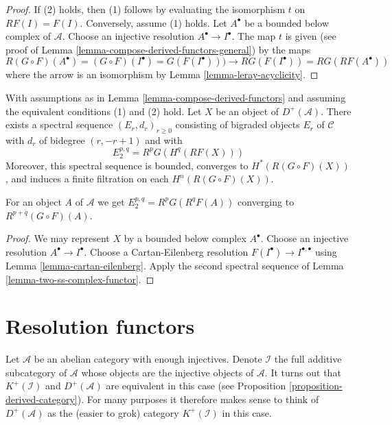 \begin{proof}
If (2) holds, then (1) follows by evaluating the isomorphism
$t$ on $RF(I) = F(I)$. Conversely, assume (1) holds.
Let $A^\bullet$ be a bounded below complex of $\mathcal{A}$.
Choose an injective resolution $A^\bullet \to I^\bullet$.
The map $t$ is given (see proof of
Lemma \ref{lemma-compose-derived-functors-general})
by the maps
$$
R(G \circ F)(A^\bullet) =
(G \circ F)(I^\bullet) =
G(F(I^\bullet))) \to
RG(F(I^\bullet)) =
RG(RF(A^\bullet))
$$
where the arrow is an isomorphism by
Lemma \ref{lemma-leray-acyclicity}.
\end{proof}

\begin{lemma}
\label{lemma-grothendieck-spectral-sequence}
With assumptions as in Lemma \ref{lemma-compose-derived-functors}
and assuming the equivalent conditions (1) and (2) hold.
Let $X$ be an object of $D^{+}(\mathcal{A})$.
There exists a spectral sequence $(E_r, d_r)_{r \geq 0}$
consisting of bigraded objects $E_r$ of $\mathcal{C}$ with
$d_r$ of bidegree $(r, - r + 1)$ and with
$$
E_2^{p, q} = R^pG(H^q(RF(X)))
$$
Moreover, this spectral sequence is bounded, converges to
$H^*(R(G \circ F)(X))$, and induces a finite filtration
on each $H^n(R(G \circ F)(X))$.
\end{lemma}

\noindent
For an object $A$ of $\mathcal{A}$ we get
$E_2^{p, q} = R^pG(R^qF(A))$ converging to $R^{p + q}(G \circ F)(A)$.

\begin{proof}
We may represent $X$ by a bounded below complex $A^\bullet$.
Choose an injective resolution $A^\bullet \to I^\bullet$.
Choose a Cartan-Eilenberg resolution
$F(I^\bullet) \to I^{\bullet, \bullet}$ using
Lemma \ref{lemma-cartan-eilenberg}.
Apply the second spectral sequence of
Lemma \ref{lemma-two-ss-complex-functor}.
\end{proof}






\section{Resolution functors}
\label{section-derived-category}

\noindent
Let $\mathcal{A}$ be an abelian category with enough injectives.
Denote $\mathcal{I}$ the full additive subcategory of $\mathcal{A}$ whose
objects are the injective objects of $\mathcal{A}$.
It turns out that $K^{+}(\mathcal{I})$ and $D^{+}(\mathcal{A})$
are equivalent in this case (see
Proposition \ref{proposition-derived-category}).
For many purposes it therefore makes sense to think of
$D^{+}(\mathcal{A})$ as the (easier to grok) category $K^{+}(\mathcal{I})$
in this case.

